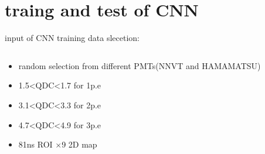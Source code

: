\documentclass[11pt,compress,xcolor=x11names,UTF8]{beamer}
\begin{document}
\section{traing and test of CNN}
\begin{frame}{input of CNN}
training data slecetion:
\begin{columns}
\begin{column}{.47\textwidth}
	\begin{itemize}
		\item random selection from different PMTs(NNVT and HAMAMATSU) 
		\item 1.5<QDC<1.7 for 1p.e
		\item 3.1<QDC<3.3 for 2p.e
		\item 4.7<QDC<4.9 for 3p.e
		\item 81ns ROI $\times$9 2D map 
	\end{itemize}
\end{column}
\begin{column}{.47\textwidth}
\end{column}
\end{columns}
\end{frame}
\end{document}
